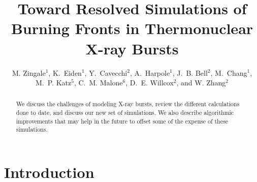 \documentclass[a4paper]{jpconf}
\begin{document}
\title{Toward Resolved Simulations of Burning Fronts in Thermonuclear
       X-ray Bursts}

\author{M. Zingale$^1$,
        K.~Eiden$^1$,
        Y.~Cavecchi$^2$,
        A.~Harpole$^1$,
        J.~B. Bell$^2$,
        M.~Chang$^1$,
        M.~P. Katz$^5$,
        C.~M. Malone$^6$, 
        D.~E. Willcox$^2$, and
        W. Zhang$^2$}

\address{$^1$Department of Physics and Astronomy, Stony Brook
  University, Stony Brook, NY 11794-3800 USA}

\address{$^2$Center for Computational Sciences and Engineering,
  Lawrence Berkeley National Lab, Berkeley, CA 94720 USA}

\address{$^3$National Energy Research Scientific Computing Center,
  Lawrence Berkeley National Lab, Berkeley, CA 94720 USA}

\address{$^4$Department of Physics and Astronomy, Michigan State
  University, East Lansing, Michigan 48824 USA}

\address{$^5$NVIDIA Corporation, 2788 San Tomas Expressway,
  Santa Clara, CA, 95050 USA}

\address{$^6$Los Alamos National Laboratory, Los Alamos, NM, 87545 USA}

\begin{abstract}
We discuss the challenges of modeling X-ray bursts, review the different
calculations done to date, and discuss our new set of simulations.  We also
describe algorithmic improvements that may help in the future to offset some
of the expense of these simulations.
\end{abstract}




\section{Introduction}
\end{document}
